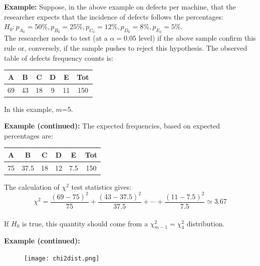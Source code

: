 \begin{frame}
  \textbf{Example:}
  Suppose, in the above example on defects per machine, that the researcher expects that the incidence of defects follows the percentages:\\
  \vspace{0.25cm}
  $H_0: p_{A_0}=50\%, p_{B_0}=25\%, p_{C_0}=12\%, p_{D_0}=8\%, p_{E_0}=5\% $.\\
  \vspace{0.25cm}
  The researcher needs to test (at a $\alpha=0.05$ level) if the above sample confirm this rule or, conversely, if the sample pushes to reject this hypothesis. The observed table of defects frequency counts is:\\
  \vspace{0.25cm}
  \begin{center}
    \begin{tabular}{|c|c|c|c|c|c|}
      \hline      
       A&B&C&D&E &Tot\\
      \hline
     69&43&18&9&11&150\\
\hline
 \end{tabular}
\end{center}
  \vspace{0.25cm}
In this example, $m$=5.
\end{frame}

\begin{frame}
  \textbf{Example (continued):}
  The expected frequencies, based on expected percentages are:\\
  \vspace{0.25cm}
  \begin{center}
    \begin{tabular}{|c|c|c|c|c|c|}
      \hline      
      A&B&C&D&E &Tot\\
      \hline
      75&37.5&18&12&7.5&150\\
      \hline
    \end{tabular}
  \end{center}
  \vspace{0.35cm}
  The calculation of $\chi^2$ test statistics gives:\\
  $$\chi^2=\frac{(69-75)^2}{75}+ \frac{(43-37.5)^2}{37.5}+\cdots + \frac{(11-7.5)^2}{7.5}\simeq 3.67$$\\
  \vspace{0.35cm}
  If $H_0$ is true, this quantity should come from a $\chi^2_{m-1}=\chi^2_{4}$ distribution.
\end{frame}

\begin{frame}
  \textbf{Example (continued):}\\
  \vspace{0.25cm}
  \begin{figure}[h!]
   \centering
   \texttt{[image: chi2dist.png]}
  \end{figure}
\end{frame}

